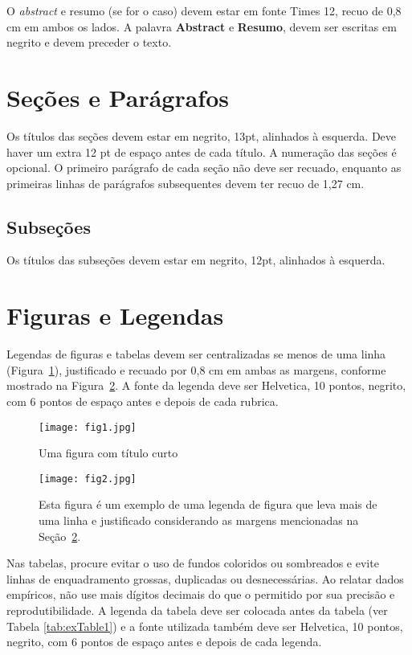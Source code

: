 \documentclass[12pt]{article}
\begin{document}
O \textit{abstract} e resumo (se for o caso) devem estar em fonte Times 12,
recuo de 0,8 cm em ambos os lados. A palavra \textbf{Abstract} e \textbf{Resumo},
devem ser escritas em negrito e devem preceder o texto.

\section{Seções e Parágrafos}

Os títulos das seções devem estar em negrito, 13pt, alinhados à esquerda. Deve haver um extra 12 pt de espaço antes de cada título. A numeração das seções é opcional. O primeiro parágrafo de cada seção não deve ser recuado, enquanto as primeiras linhas de parágrafos subsequentes devem ter recuo de 1,27 cm.

\subsection{Subseções}

Os títulos das subseções devem estar em negrito, 12pt, alinhados à esquerda.

\section{Figuras e Legendas}\label{sec:figs}


Legendas de figuras e tabelas devem ser centralizadas se menos de uma linha
(Figura~\ref{fig:exemploFig1}), justificado e recuado por 0,8 cm em ambas as margens, conforme mostrado na Figura~\ref{fig:exemploFig2}. A fonte da legenda deve
ser Helvetica, 10 pontos, negrito, com 6 pontos de espaço antes e depois de cada
rubrica.

\begin{figure}[ht]
\centering
\texttt{[image: fig1.jpg]}
\caption{Uma figura com título curto}
\label{fig:exemploFig1}
\end{figure}

\begin{figure}[ht]
\centering
\texttt{[image: fig2.jpg]}
\caption{Esta figura é um exemplo de uma legenda de figura que leva mais de uma
   linha e justificado considerando as margens mencionadas na Seção~\ref{sec:figs}.}
\label{fig:exemploFig2}
\end{figure}

Nas tabelas, procure evitar o uso de fundos coloridos ou sombreados e evite
linhas de enquadramento grossas, duplicadas ou desnecessárias. Ao relatar dados empíricos, não use mais dígitos decimais do que o permitido por sua precisão e
reprodutibilidade. A legenda da tabela deve ser colocada antes da tabela (ver Tabela \ref{tab:exTable1}) e a fonte utilizada também deve ser Helvetica, 10 pontos, negrito, com 6 pontos de espaço antes e depois de cada legenda.
\end{document}
